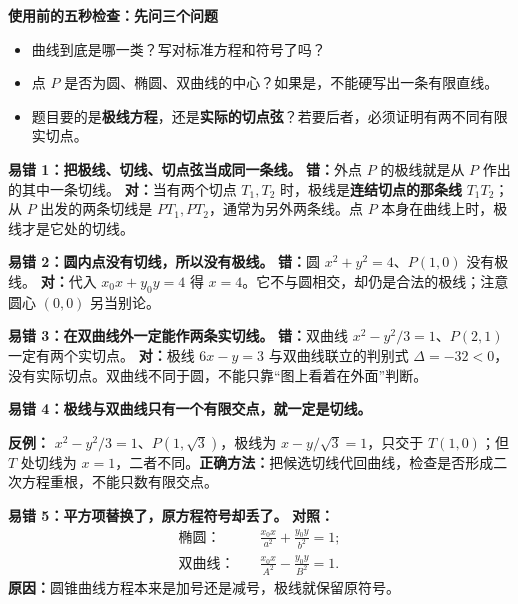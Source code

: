 \begin{trapbox}
\textbf{\textcolor{CTrap}{使用前的五秒检查：先问三个问题}}
\begin{itemize}[leftmargin=*,itemsep=0.25em]
\item 曲线到底是哪一类？写对标准方程和符号了吗？
\item 点 $P$ 是否为圆、椭圆、双曲线的中心？如果是，不能硬写出一条有限直线。
\item 题目要的是\textbf{极线方程}，还是\textbf{实际的切点弦}？若要后者，必须证明有两不同有限实切点。
\end{itemize}

\medskip
\textbf{\textcolor{CTrap}{易错 1：把极线、切线、切点弦当成同一条线。}}
\textbf{错：}外点 $P$ 的极线就是从 $P$ 作出的其中一条切线。
\textbf{对：}当有两个切点 $T_1,T_2$ 时，极线是\textbf{连结切点的那条线} $T_1T_2$；从 $P$ 出发的两条切线是 $PT_1,PT_2$，通常为另外两条线。点 $P$ 本身在曲线上时，极线才是它处的切线。

\medskip
\textbf{\textcolor{CTrap}{易错 2：圆内点没有切线，所以没有极线。}}
\textbf{错：}圆 $x^2+y^2=4$、$P(1,0)$ 没有极线。
\textbf{对：}代入 $x_0x+y_0y=4$ 得 $x=4$。它不与圆相交，却仍是合法的极线；注意圆心 $(0,0)$ 另当别论。

\medskip
\textbf{\textcolor{CTrap}{易错 3：在双曲线外一定能作两条实切线。}}
\textbf{错：}双曲线 $x^2-y^2/3=1$、$P(2,1)$ 一定有两个实切点。
\textbf{对：}极线 $6x-y=3$ 与双曲线联立的判别式 $\Delta=-32<0$，没有实际切点。双曲线不同于圆，不能只靠“图上看着在外面”判断。

\medskip
\begin{samepage}
\textbf{\textcolor{CTrap}{易错 4：极线与双曲线只有一个有限交点，就一定是切线。}}

\begin{center}\end{center}
\textbf{反例：} $x^2-y^2/3=1$、$P(1,\sqrt3)$，极线为 $x-y/\sqrt3=1$，只交于 $T(1,0)$；但 $T$ 处切线为 $x=1$，二者不同。\textbf{正确方法：}把候选切线代回曲线，检查是否形成二次方程重根，不能只数有限交点。
\end{samepage}

\medskip
\textbf{\textcolor{CTrap}{易错 5：平方项替换了，原方程符号却丢了。}}
\textbf{对照：}
\[
\begin{aligned}
\text{椭圆：}&\quad \frac{x_0x}{a^2}+\frac{y_0y}{b^2}=1;\\
\text{双曲线：}&\quad \frac{x_0x}{A^2}-\frac{y_0y}{B^2}=1.
\end{aligned}
\]
\textbf{原因：}圆锥曲线方程本来是加号还是减号，极线就保留原符号。


\end{trapbox}
